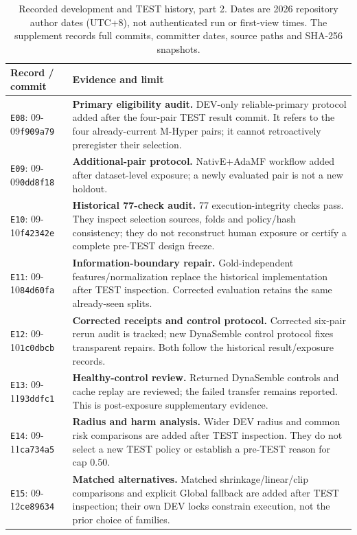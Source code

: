 \begin{table}[tbp]
\centering\footnotesize
\caption{Recorded development and TEST history, part 2. Dates are 2026 repository author dates (UTC+8), not authenticated run or first-view times. The supplement records full commits, committer dates, source paths and SHA-256 snapshots.}
\label{tab:history-2}
\begin{tabularx}{\linewidth}{@{}p{.15\linewidth}X@{}}
\toprule
Record / commit & Evidence and limit\\
\midrule
\texttt{E08}: 09-09\newline\texttt{f909a79} & \textbf{Primary eligibility audit.} DEV-only reliable-primary protocol added after the four-pair TEST result commit. It refers to the four already-current M-Hyper pairs; it cannot retroactively preregister their selection.\\[3pt]
\texttt{E09}: 09-09\newline\texttt{0dd8f18} & \textbf{Additional-pair protocol.} NativE+AdaMF workflow added after dataset-level exposure; a newly evaluated pair is not a new holdout.\\[3pt]
\texttt{E10}: 09-10\newline\texttt{f42342e} & \textbf{Historical 77-check audit.} 77 execution-integrity checks pass. They inspect selection sources, folds and policy/hash consistency; they do not reconstruct human exposure or certify a complete pre-TEST design freeze.\\[3pt]
\texttt{E11}: 09-10\newline\texttt{84d60fa} & \textbf{Information-boundary repair.} Gold-independent features/normalization replace the historical implementation after TEST inspection. Corrected evaluation retains the same already-seen splits.\\[3pt]
\texttt{E12}: 09-10\newline\texttt{1c0dbcb} & \textbf{Corrected receipts and control protocol.} Corrected six-pair rerun audit is tracked; new DynaSemble control protocol fixes transparent repairs. Both follow the historical result/exposure records.\\[3pt]
\texttt{E13}: 09-11\newline\texttt{93ddfc1} & \textbf{Healthy-control review.} Returned DynaSemble controls and cache replay are reviewed; the failed transfer remains reported. This is post-exposure supplementary evidence.\\[3pt]
\texttt{E14}: 09-11\newline\texttt{ca734a5} & \textbf{Radius and harm analysis.} Wider DEV radius and common risk comparisons are added after TEST inspection. They do not select a new TEST policy or establish a pre-TEST reason for cap 0.50.\\[3pt]
\texttt{E15}: 09-12\newline\texttt{ce89634} & \textbf{Matched alternatives.} Matched shrinkage/linear/clip comparisons and explicit Global fallback are added after TEST inspection; their own DEV locks constrain execution, not the prior choice of families.\\[3pt]
\bottomrule
\end{tabularx}
\end{table}
